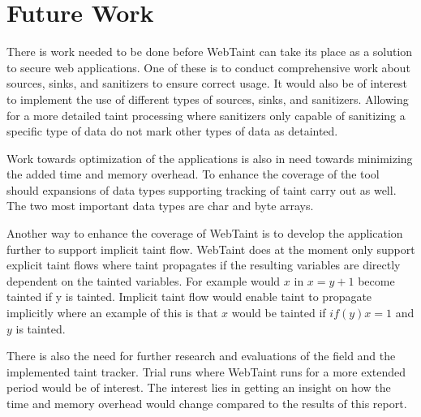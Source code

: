 \chapter{Future Work}
\label{FutureWork}
There is work needed to be done before WebTaint can take its place as a solution to secure web applications. One of these is to conduct comprehensive work about sources, sinks, and sanitizers to ensure correct usage. It would also be of interest to implement the use of different types of sources, sinks, and sanitizers. Allowing for a more detailed taint processing where sanitizers only capable of sanitizing a specific type of data do not mark other types of data as detainted. 

Work towards optimization of the applications is also in need towards minimizing the added time and memory overhead. To enhance the coverage of the tool should expansions of data types supporting tracking of taint carry out as well. The two most important data types are char and byte arrays. 

Another way to enhance the coverage of WebTaint is to develop the application further to support implicit taint flow. WebTaint does at the moment only support explicit taint flows where taint propagates if the resulting variables are directly dependent on the tainted variables. For example would $ x $ in $ x = y + 1 $ become tainted if y is tainted. Implicit taint flow would enable taint to propagate implicitly where an example of this is that $ x $ would be tainted if $ if (y) x = 1 $ and $ y $ is tainted.

There is also the need for further research and evaluations of the field and the implemented taint tracker. Trial runs where WebTaint runs for a more extended period would be of interest. The interest lies in getting an insight on how the time and memory overhead would change compared to the results of this report.